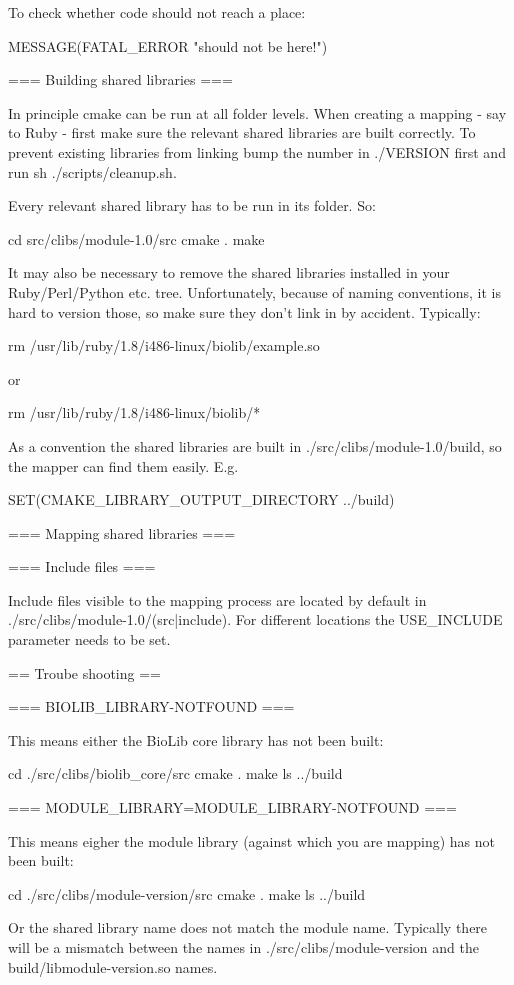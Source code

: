 To check whether code should not reach a place:

  MESSAGE(FATAL_ERROR "should not be here!")

=== Building shared libraries ===

In principle cmake can be run at all folder levels. When creating a
mapping - say to Ruby - first make sure the relevant shared libraries
are built correctly. To prevent existing libraries from linking bump
the number in ./VERSION first and run sh ./scripts/cleanup.sh.

Every relevant shared library has to be run in its folder. So:

  cd src/clibs/module-1.0/src
	cmake .
	make

It may also be necessary to remove the shared libraries installed in
your Ruby/Perl/Python etc. tree. Unfortunately, because of naming
conventions, it is hard to version those, so make sure they don't link
in by accident. Typically:

  rm /usr/lib/ruby/1.8/i486-linux/biolib/example.so

or

	rm /usr/lib/ruby/1.8/i486-linux/biolib/*

As a convention the shared libraries are built in
./src/clibs/module-1.0/build, so the mapper can find them easily. E.g.

  SET(CMAKE_LIBRARY_OUTPUT_DIRECTORY ../build)

=== Mapping shared libraries ===



=== Include files ===

Include files visible to the mapping process are located by default in
./src/clibs/module-1.0/(src|include). For different locations the
USE_INCLUDE parameter needs to be set.

== Troube shooting ==

=== BIOLIB_LIBRARY-NOTFOUND ===

This means either the BioLib core library has not been built:

  cd ./src/clibs/biolib_core/src
	cmake .
	make
	ls ../build

=== MODULE_LIBRARY=MODULE_LIBRARY-NOTFOUND ===

This means eigher the module library (against which you are mapping) has not
been built:

  cd ./src/clibs/module-version/src
	cmake .
	make
	ls ../build

Or the shared library name does not match the module name. Typically
there will be a mismatch between the names in
./src/clibs/module-version and the build/libmodule-version.so names.

